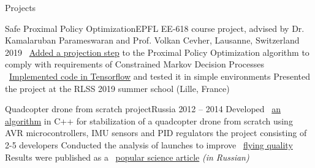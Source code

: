 \documentclass{resume} %
\newcommand*{\img}[1]{%
	\raisebox{-.02\baselineskip}{%
		\texttt{[image: \#1]}%
	}%
}
\newcommand*{\emoji}[1]{\img{./emoji/\imgpref#1.png}}
\newcommand*{\mybold}[1]{{\color{pinkunderline} #1}}
\def\imgpref{bleak-}
\newcommand{\mylink}{{\color{gray}\faExternalLink}}
\begin{document}
\begin{rSection}{Projects}

	\begin{rSubsection}{Safe Proximal Policy Optimization}{}{EPFL EE-618 course project, advised by Dr. Kamalaruban Parameswaran and Prof. Volkan Cevher, Lausanne, Switzerland \emoji{flag-ch}}{2019}
		\myitem \mylink~\href{https://www.overleaf.com/read/cvxkswbspgpb}{Added a projection step} to the \mybold{Proximal Policy Optimization} algorithm to comply with requirements of \mybold{Constrained Markov Decision Processes}
		\myitem \mylink~\href{https://github.com/sergeivolodin/SafeContinuousStateRL}{Implemented code in Tensorflow} and tested it in simple environments
		\myitem Presented the project at the RLSS 2019 summer school (Lille, France)
	\end{rSubsection}

	\begin{rSubsection}{Quadcopter drone from scratch project}{}{Russia \emoji{flag-ru}}{2012 -- 2014}
		\myitem Developed \mylink~\href{https://github.com/it-workshop/Quadrocopter}{an algorithm} in C++ for stabilization of a quadcopter drone from scratch using AVR microcontrollers, IMU sensors and PID regulators
		\myitem \mybold{Co-managed} the project consisting of 2-5 developers
		\myitem Conducted the analysis of launches to improve \mylink~\href{https://www.youtube.com/watch?v=AxDoO-gNRtc}{flying quality}
		\myitem Results were \mybold{published} as a \mylink~\href{http://web.archive.org/web/20141016114551/http://habrahabr.ru/company/technoworks/blog/216437/}{popular science article} {\em (in Russian)}
	\end{rSubsection}
\end{rSection}
\end{document}
